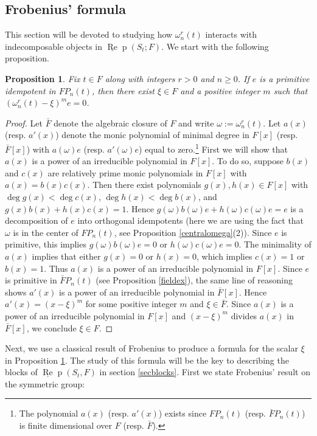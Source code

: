 \documentclass{amsart}
\newtheorem{proposition}[theorem]{Proposition}
\theoremstyle{definition}
\def\uRep{\underline{\operatorname{Re}}\!\operatorname{p}}
\renewcommand{\1}{_{(1)}}
\renewcommand{\2}{_{(2)}}
\newcommand{\3}{_{(3)}}
\newcommand{\4}{_{(4)}}
\begin{document}
\subsection{Frobenius' formula} This section will be devoted to studying how $\omega^r_n(t)$ interacts with indecomposable objects in $\uRep(S_t; F)$.  We start with the following proposition.


\begin{proposition}\label{xi}  Fix $t\in F$ along with integers $r>0$ and $n\geq0$.  If $e$ is a primitive idempotent in $FP_n(t)$, then there exist $\xi\in F$ and a positive integer $m$ such that $(\omega_n^r(t)-\xi)^me=0$.
\end{proposition}

\begin{proof}  Let $\bar{F}$ denote the algebraic closure of $F$ and write $\omega:=\omega_n^r(t)$.  Let $a(x)$ (resp. $a'(x)$) denote the monic polynomial of minimal degree in $F[x]$ (resp. $\bar{F}[x]$) with $a(\omega)e$ (resp. $a'(\omega)e$) equal to zero.\footnote{The polynomial $a(x)$ (resp. $a'(x)$) exists since $FP_n(t)$ (resp. $\bar{F}P_n(t)$) is finite dimensional over $F$ (resp. $\bar{F}$).}  First we will show that $a(x)$ is a power of an irreducible polynomial in $F[x]$.  To do so, suppose $b(x)$ and $c(x)$ are relatively prime monic polynomials in $F[x]$ with $a(x)=b(x)c(x)$.  Then there exist polynomials $g(x), h(x)\in F[x]$ with $\deg g(x)<\deg c(x)$, $\deg h(x)<\deg b(x)$, and $g(x)b(x)+h(x)c(x)=1$.  Hence $g(\omega)b(\omega)e+h(\omega)c(\omega)e=e$ is a decomposition of $e$ into orthogonal idempotents (here we are using the fact that $\omega$ is in the center of $FP_n(t)$, see Proposition \ref{centralomega}(2)).  Since $e$ is primitive, this implies $g(\omega)b(\omega)e=0$ or $h(\omega)c(\omega)e=0$.  The minimality of $a(x)$ implies that either $g(x)=0$ or $h(x)=0$, which implies $c(x)=1$ or $b(x)=1$.  Thus $a(x)$ is a power of an irreducible polynomial in $F[x]$.  Since $e$ is primitive in $\bar{F}P_n(t)$ (see Proposition \ref{fieldex}), the same line of reasoning shows $a'(x)$ is a power of an irreducible polynomial in $\bar{F}[x]$.  Hence $a'(x)=(x-\xi)^m$ for some positive integer $m$ and $\xi\in\bar{F}$. Since $a(x)$ is a power of an irreducible polynomial in $F[x]$ and $(x-\xi)^m$ divides $a(x)$ in $\bar{F}[x]$, we conclude $\xi\in F$.
\end{proof}

Next, we use a classical result of Frobenius to produce a formula for the scalar $\xi$ in Proposition \ref{xi}.  The study of this formula will be the key to describing the blocks of $\uRep(S_t, F)$ in section \ref{secblocks}.  First we state Frobenius' result on the symmetric group:
\end{document}
